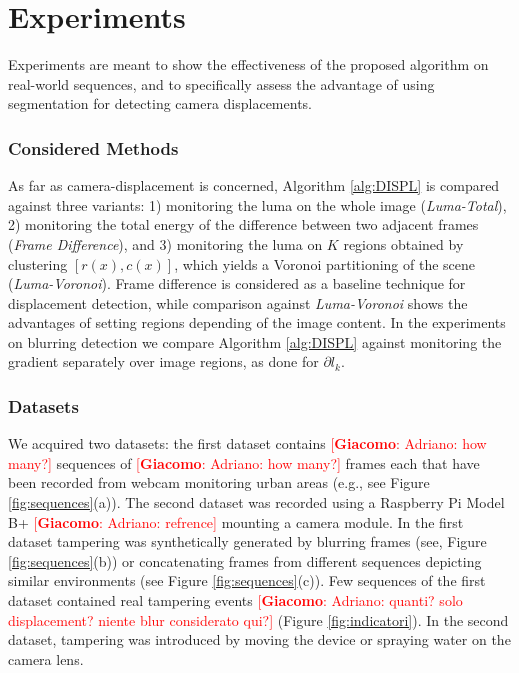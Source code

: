 \documentclass{llncs}
\newcommand{\gi}[1]{{\textcolor{red}{[\small \textbf{Giacomo}: #1]}}}
\begin{document}

\section{Experiments}\label{sec:experiments}

Experiments are meant to show the effectiveness of the proposed algorithm on real-world sequences, and to specifically assess the advantage of using segmentation for detecting camera displacements. 
\subsubsection{Considered Methods}
As far as camera-displacement is concerned, Algorithm \eqref{alg:DISPL} is compared against three variants: 1) monitoring the luma on the whole image (\emph{Luma-Total}), 2) monitoring the total energy of the difference between two adjacent frames (\emph{Frame Difference}), and 3) monitoring the luma on $K$ regions obtained by clustering $[r(x), c(x)]$, which yields a Voronoi partitioning of the scene (\emph{Luma-Voronoi}). Frame difference is considered as a baseline technique for displacement detection, while comparison against \emph{Luma-Voronoi} shows the advantages of setting regions depending of the image content. In the experiments on blurring detection we compare Algorithm \ref{alg:DISPL} against monitoring the gradient separately over image regions, as done for $\partial l_k$.

\subsubsection{Datasets}
We acquired two datasets: the first dataset contains \gi{Adriano: how many?} sequences of \gi{Adriano: how many?} frames each that have been recorded from webcam monitoring urban areas (e.g., see Figure \ref{fig:sequences}(a)). The second dataset was recorded using a Raspberry Pi Model B+ \gi{Adriano: refrence} mounting a camera module. In the first dataset tampering was synthetically generated by blurring frames (see, Figure \ref{fig:sequences}(b)) or concatenating frames from different sequences depicting similar environments (see Figure \ref{fig:sequences}(c)). Few sequences of the first dataset contained real tampering events \gi{Adriano: quanti? solo displacement? niente blur considerato qui?} (Figure \ref{fig:indicatori}). In the second dataset, tampering was introduced by moving the device or spraying water on the camera lens. %
\end{document}
